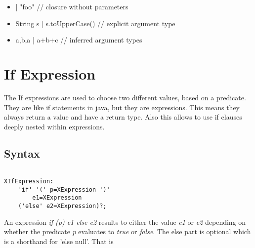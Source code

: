 \documentclass[a4paper,10pt]{scrreprt}
\newlength{\itemindentlen}
\begin{document}
\setlength{\itemindentlen}{\textwidth}
\begin{itemize}
\addtolength{\itemindentlen}{-2em}

\item \begin{minipage}[t]{\itemindentlen}
| "foo"   // closure without parameters
\end{minipage}

\item \begin{minipage}[t]{\itemindentlen}
String s | s.toUpperCase() // explicit argument type
\end{minipage}

\item \begin{minipage}[t]{\itemindentlen}
a,b,a | a+b+c  // inferred argument types
\end{minipage}

\end{itemize}
\addtolength{\itemindentlen}{2em}







\section{If Expression}
\label{IfExpression}

The If expressions are used to choose two different values, based on a predicate.
They are like if statements in java, but they are expressions. This means they always return a value and have a return type. Also this allows
to use if clauses deeply nested within expressions. 

\subsection{ Syntax }


\begin{lstlisting}

XIfExpression:
	'if' '(' p=XExpression ')'
		e1=XExpression
	('else' e2=XExpression)?;

\end{lstlisting}


An expression \emph{if (p) e1 else e2} results to either the value \emph{e1} or \emph{e2} depending on whether the predicate \emph{p} evaluates to \emph{true} or \emph{false}. 
The else part is optional which is a shorthand for 'else null'.
That is 
\end{document}

